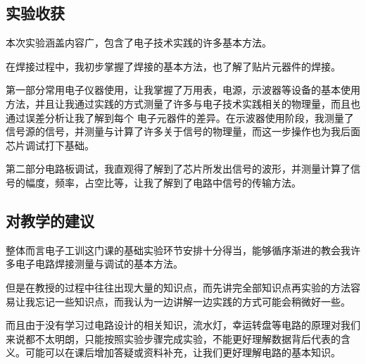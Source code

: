 \documentclass{zjureport}
\begin{document}
\subsection{实验收获}
本次实验涵盖内容广，包含了电子技术实践的许多基本方法。

在焊接过程中，我初步掌握了焊接的基本方法，也了解了贴片元器件的焊接。

第一部分常用电子仪器使用，让我掌握了万用表，电源，示波器等设备的基本使用方法，并且让我通过实践的方式测量了许多与电子技术实践相关的物理量，而且也通过误差分析让我了解到每个
电子元器件的差异。在示波器使用阶段，我测量了信号源的信号，并测量与计算了许多关于信号的物理量，而这一步操作也为我后面芯片调试打下基础。

第二部分电路板调试，我直观得了解到了芯片所发出信号的波形，并测量计算了信号的幅度，频率，占空比等，让我了解到了电路中信号的传输方法。
\subsection{对教学的建议}
整体而言电子工训这门课的基础实验环节安排十分得当，能够循序渐进的教会我许多电子电路焊接测量与调试的基本方法。

但是在教授的过程中往往出现大量的知识点，而先讲完全部知识点再实验的方法容易让我忘记一些知识点，而我认为一边讲解一边实践的方式可能会稍微好一些。

而且由于没有学习过电路设计的相关知识，流水灯，幸运转盘等电路的原理对我们来说都不太明朗，只能按照实验步骤完成实验，不能更好理解数据背后代表的含义。可能可以在课后增加答疑或资料补充，让我们更好理解电路的基本知识。
\end{document}
